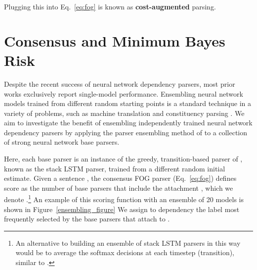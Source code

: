\documentclass[11pt,letterpaper]{article}
\newcommand{\ignore}[1]{}
\newcommand{\adhicomment}[1]{\ignore{\textcolor{green}{{\textbf{[#1 --\textsc{adhi}]}}}}}
\newcommand{\cjd}[1]{\textcolor{cyan}{\ignore{{\textbf{[#1 --\textsc{cjd}]}}}}}
\newcommand{\nascomment}[1]{\ignore{\textcolor{blue}{{\textbf{[#1 --\textsc{nas}]}}}}}
\begin{document}
Plugging this into Eq.~\ref{eq:fog} is known as \textbf{cost-augmented} parsing.

\section{Consensus and Minimum Bayes Risk}\label{sec:mbr}

Despite the recent success of neural network dependency parsers, most prior works exclusively report single-model performance. Ensembling neural network models trained from different random starting points is a standard technique in a variety of problems, such as machine translation \cite{seq_to_seq} and constituency parsing \cite{grammar_foreign}. We aim to investigate the benefit of ensembling independently trained neural network dependency parsers by applying the parser ensembling method of  to a collection of  strong neural network base parsers. \adhicomment{Added some sentences as a more gentle introduction to ensembling}

Here, each base parser is an instance of the greedy, transition-based parser of , known as the stack LSTM parser, trained from a different random initial estimate.  Given a sentence , the consensus FOG parser (Eq.~\ref{eq:fog}) defines  score  as the number
of base parsers that include the attachment , which we denote .\footnote{An alternative to building an ensemble of stack LSTM parsers in this way would be to average the softmax decisions at each timestep (transition), similar to . \ignore{\cjd{they didn't do dep parsing, but they did it in this paper}  Our approach is simpler to implement and more memory-efficient, since each parser can be run sequentially.  Further, voting on each attachment is more amenable to the distillation we will explore in \S\ref{sec:distillation}. \nascomment{Chris wanted us to make this clear; I think it would be good to cite the kind of ensemble he suggests is an alternative, but I'm not sure what the citation would be}\adhicomment{I'm not aware of any works that did that.}}} An example of this scoring function with an ensemble of 20 models is shown in Figure~\ref{ensembling_figure} We assign to dependency  the label most frequently selected by the base parsers that attach  to .
\end{document}

